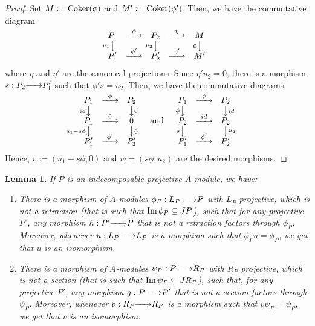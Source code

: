 \documentclass{article}
\newtheorem{lemma}[theorem]{Lemma}
\theoremstyle{definition}
\newcommand{\Coker}{{ \rm Coker }}
\renewcommand{\Im}{{\rm Im}\,}
\newcommand{\rightmap}[1]{\smash{\mathop{\hbox to 
20pt{\rightarrowfill}}\limits^{#1}}}
\newcommand{\shortlmapdown}[1]
{\llap{$\vcenter{\hbox{$\scriptstyle#1$}}$}\big\downarrow}
\newcommand{\shortrmapdown}[1]
{\big\downarrow\rlap{$\vcenter{\hbox{$\scriptstyle#1$}}$}}
\begin{document}
\begin{proof} Set $M:=\Coker(\phi)$ and $M':=\Coker(\phi')$. Then, we have the  commutative diagram
$$\begin{matrix}
P_1&\rightmap{\phi}&P_2&\rightmap{\eta}&M\\
\shortlmapdown{u_1}&&\shortlmapdown{u_2}&&\shortlmapdown{0}\\
P'_1&\rightmap{\phi'}&P'_2&\rightmap{\eta'}&M'\\
\end{matrix}$$
where $\eta$ and $\eta'$ are the canonical projections. Since $\eta'u_2=0$, there is a morphism $s:P_2\rightmap{}P'_1$ such that $\phi's=u_2$. Then, we have the commutative diagrams 
$$\begin{matrix} P_1&\rightmap{\phi}&P_2\\
\shortlmapdown{id}&&\shortrmapdown{0}\\
P_1&\rightmap{0}&0\\
\shortlmapdown{u_1-s\phi}&&\shortrmapdown{0}\\
P'_1&\rightmap{\phi'}&P'_2\\
\end{matrix} \hbox{ \  \ \ \ and \ \ \  \ }
\begin{matrix} P_1&\rightmap{\phi}&P_2\\
\shortlmapdown{\phi}&&\shortrmapdown{id}\\
P_2&\rightmap{id}&P_2\\
\shortlmapdown{s}&&\shortrmapdown{u_2}\\
P'_1&\rightmap{\phi'}&P'_2\\
\end{matrix}$$
Hence, $v:=(u_1-s\phi,0)$ and $w=(s\phi,u_2)$ are the desired morphisms. 
\end{proof}  

   
   
\begin{lemma}\label{L: morfismos universales de P} If $P$ is an indecomposable projective $A$-module,  we have:
\begin{enumerate}
\item There is a morphism of $A$-modules $\phi_P : L_P \rightmap{} P$ with  $L_P$ projective, which is not a retraction (that is such that  $\Im \phi_P\subseteq JP$),   such that for any projective $P'$, any morphism $h:P'\rightmap{}P$ that is not a retraction factors through $\phi_P$. 
Moreover, whenever $u : L_P \rightmap{} L_P$ is a morphism such that 
$\phi_Pu=\phi_P$, we get that $u$ is an isomorphism. 

\item There is a morphism of $A$-modules 
$\psi_P: P \rightmap{} R_P$ with $R_P$ projective, which is not a section (that is such that  $\Im \psi_P\subseteq JR_P$),  such that, for any projective $P'$,  any morphism $g:P\rightmap{}P'$ that is not a section factors through $\psi_P$. Moreover, whenever  $v:R_P\rightmap{}R_P$ is a morphism such that $v\psi_P=\psi_P$, we get that $v$ is an isomorphism.
\end{enumerate}
\end{lemma}  
\end{document}
